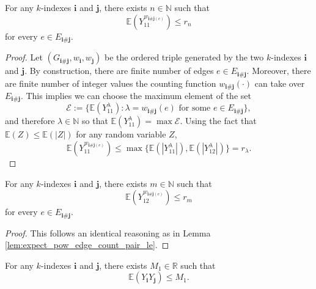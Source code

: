 \begin{lemma} %
  \notready
  \label{lem:expect_pow_edge_count_pair_le} 
  For any $k$-indexes $\mathbf{i}$ and $\mathbf{j}$, there exists $n \in \mathbb{N}$ such that
  \[
  \mathbb{E} (Y_{11}^{w_{\mathbf{i} \# \mathbf{j} (e)}}) \leq r_n
  \]
  for every $e \in E_{\mathbf{i} \# \mathbf{j}}$.
\end{lemma}
\begin{proof}
  Let $(G_{\mathbf{i}\#\mathbf{j}},w_\mathbf{i},w_\mathbf{j})$ be the ordered triple generated by the two $k$-indexes $\mathbf{i}$ and $\mathbf{j}$. 
  By construction, there are finite number of edges $e \in E_{\mathbf{i} \# \mathbf{j}}$.
  Moreover, there are finite number of integer values the counting function $w_{\mathbf{i} \# \mathbf{j}}(\cdot)$ can take over $E_{\mathbf{i} \# \mathbf{j}}$.
  This implies we can choose the maximum element of the set
  \[
  \mathscr{E} := \{ \mathbb{E} (Y_{11}^\lambda) : \lambda = w_{\mathbf{i} \# \mathbf{j}}(e) \text{ for some } e \in E_{\mathbf{i} \# \mathbf{j}} \},
  \]
  and therefore $\lambda \in \mathbb{N}$ so that $\mathbb{E}(Y_{11}^\lambda) = \max \mathscr{E}$.
  Using the fact that $\mathbb{E}(Z) \leq \mathbb{E}(|Z|)$ for any random variable $Z$,
  \[
  \mathbb{E} (Y_{11}^{w_{\mathbf{i} \# \mathbf{j} (e)}}) \leq \max\{ \mathbb{E}(|Y_{11}^\lambda|), \mathbb{E}(|Y_{12}^\lambda|) \} = r_\lambda.
  \]
\end{proof}
\begin{lemma} %
  \notready
  \label{lem:expect_pow_edge_count_pair_le'}
  For any $k$-indexes $\mathbf{i}$ and $\mathbf{j}$, there exists $m \in \mathbb{N}$ such that
  \[
  \mathbb{E} (Y_{12}^{w_{\mathbf{i} \# \mathbf{j} (e)}}) \leq r_m
  \]
  for every $e \in E_{\mathbf{i} \# \mathbf{j}}$.
\end{lemma}
\begin{proof}
  This follows an identical reasoning as in Lemma \ref{lem:expect_pow_edge_count_pair_le}.
\end{proof}
\begin{lemma}
  \notready
  \label{lem:expect_mul_le_const}
  For any $k$-indexes $\mathbf{i}$ and $\mathbf{j}$, there exists $M_1 \in \mathbb{R}$ such that
  \[
  \mathbb{E} (Y_\mathbf{i}Y_\mathbf{j}) \leq M_1.
  \]
\end{lemma}
